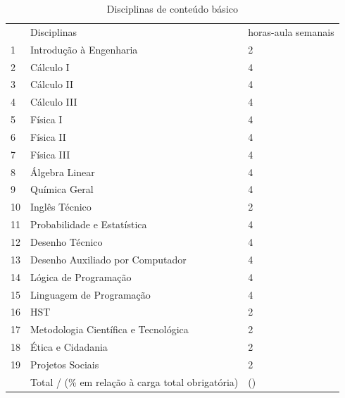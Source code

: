 \begin{destacar}
	

\begin{longtable}{|p{0.8cm}|p{7.5cm}|p{2.0cm}|} 
	\caption{Disciplinas de conteúdo básico}\label{tab5} 
	\vspace{-0.25cm}
	\\ \hline 
	\cellcolor{\cinza} & \cellcolor{\cinza}Disciplinas & \cellcolor{\cinza}horas-aula semanais  \\ 
	\hline
	1 &  Introdução à Engenharia  &  2 \\ \hline
	2 &  Cálculo I  &  4 \\ \hline
	3 &  Cálculo II  &  4 \\ \hline
	4 &  Cálculo III  &  4 \\ \hline
	5 &  Física I  &  4 \\ \hline
	6 &  Física II  &  4 \\ \hline
	7 &  Física III  &  4 \\ \hline
	8 &  Álgebra Linear  &  4 \\ \hline
	9 &  Química Geral  &  4 \\ \hline
	10 &  Inglês Técnico  &  2 \\ \hline
	11 &  Probabilidade e Estatística  &  4 \\ \hline
	12 &  Desenho Técnico  &  4 \\ \hline
	13 &  Desenho Auxiliado por Computador  &  4 \\ \hline
	14 &  Lógica de Programação  &  4 \\ \hline
	15 &  Linguagem de Programação  &  4 \\ \hline
	16 &  HST  &  2 \\ \hline
	17 &  Metodologia Científica e Tecnológica  &  2 \\ \hline
	18 &  Ética e Cidadania  &  2 \\ \hline
	19 &  Projetos Sociais  &  2 \\ \hline
	&  Total / (\% em relação à carga total obrigatória)  &  \CHBASICACR(\CHBASICAPEMIN) \\ \hline
\end{longtable}


\end{destacar}
